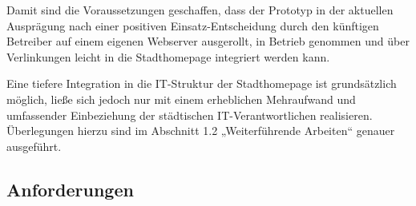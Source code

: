 \documentclass[11pt,a4paper,twoside]{article}
\begin{document}
Damit sind die Voraussetzungen geschaffen, dass der Prototyp in der aktuellen
Ausprägung nach einer positiven Einsatz-Entscheidung durch den künftigen
Betreiber auf einem eigenen Webserver ausgerollt, in Betrieb genommen und über
Verlinkungen leicht in die Stadthomepage integriert werden kann. 

Eine tiefere Integration in die IT-Struktur der Stadthomepage ist grundsätzlich
möglich, ließe sich jedoch nur mit einem erheblichen Mehraufwand und
umfassender Einbeziehung der städtischen IT-Verantwortlichen realisieren.
Überlegungen hierzu sind im Abschnitt 1.2 „Weiterführende Arbeiten“ genauer
ausgeführt.

\subsection*{Anforderungen}
\end{document}
